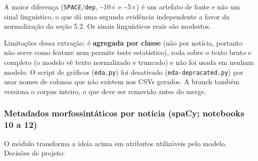 \documentclass[
  brazilian,
  11pt,
]{article}
\begin{document}
A maior diferença (\texttt{SPACE}/\texttt{dep}, \textasciitilde10× e \textasciitilde5×) é um artefato de fonte e não um sinal linguístico, o que dá uma segunda evidência independente a favor da normalização da seção 5.2. Os sinais linguísticos reais são modestos.

Limitações dessa extração: é \textbf{agregada por classe} (não por notícia, portanto não serve como feature nem permite teste estatístico), roda sobre o texto bruto e completo (o modelo vê texto normalizado e truncado) e não foi usada em nenhum modelo. O script de gráficos (\texttt{eda.py}) foi desativado (\texttt{eda-depracated.py}) por usar nomes de colunas que não existem nos CSVs gerados. A branch também versiona o corpus inteiro, o que deve ser removido antes do merge.

\subsubsection{Metadados morfossintáticos por notícia (spaCy; notebooks 10 a 12)}\label{metadados-morfossintuxe1ticos-por-notuxedcia-spacy-notebooks-10-a-12}

O módulo  transforma a ideia acima em atributos utilizáveis pelo modelo. Decisões de projeto:
\end{document}
